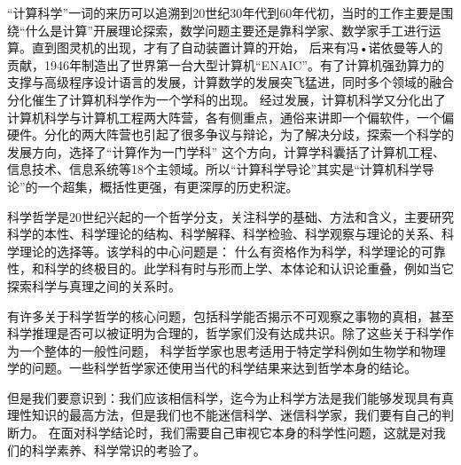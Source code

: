 \documentclass{article}
\begin{document}
“计算科学”一词的来历可以追溯到20世纪30年代到60年代初，当时的工作主要是围绕“什么是计算”开展理论探索，数学问题主要还是靠科学家、数学家手工进行运算。直到图灵机的出现，才有了自动装置计算的开始，
后来有冯•诺依曼等人的贡献，1946年制造出了世界第一台大型计算机“ENAIC”。有了计算机强劲算力的支撑与高级程序设计语言的发展，计算数学的发展突飞猛进，同时多个领域的融合分化催生了计算机科学作为一个学科的出现。
经过发展，计算机科学又分化出了计算机科学与计算机工程两大阵营，各有侧重点，通俗来讲即一个偏软件，一个偏硬件。分化的两大阵营也引起了很多争议与辩论，为了解决分歧，探索一个科学的发展方向，选择了“计算作为一门学科”
这个方向，计算学科囊括了计算机工程、信息技术、信息系统等18个主领域。所以“计算科学导论”其实是“计算机科学导论”的一个超集，概括性更强，有更深厚的历史积淀。\par

科学哲学\citep{curd1998philosophy}是20世纪兴起的一个哲学分支，关注科学的基础、方法和含义，主要研究科学的本性、科学理论的结构、科学解释、科学检验、科学观察与理论的关系、科学理论的选择等。该学科的中心问题是：
什么有资格作为科学，科学理论的可靠性，和科学的终极目的。此学科有时与形而上学、本体论和认识论重叠，例如当它探索科学与真理之间的关系时。\par

有许多关于科学哲学的核心问题，包括科学能否揭示不可观察之事物的真相，甚至科学推理是否可以被证明为合理的，哲学家们没有达成共识。除了这些关于科学作为一个整体的一般性问题，
科学哲学家也思考适用于特定学科例如生物学和物理学的问题。一些科学哲学家还使用当代的科学结果来达到哲学本身的结论。\par

但是我们要意识到：我们应该相信科学，迄今为止科学方法是我们能够发现具有真理性知识的最高方法，但是我们也不能迷信科学、迷信科学家，我们要有自己的判断力。
在面对科学结论时，我们需要自己审视它本身的科学性问题，这就是对我们的科学素养、科学常识的考验了。

\end{document}
